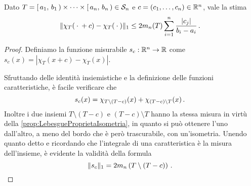\begin{lemma}\label{lemma:ContinuitaL1Semianello}
	Dato $T=\left[\,a_1,\,b_1\,\right)\times\cdots\times\left[\,a_n,\,b_n\,\right)\in\mathcal S_n$ e $c=(c_1,\dots,c_n)\in\mathbb R^n$, vale la stima
	\begin{equation*}
		\Vert \chi_T({}\cdot{}+c)-\chi_T({}\cdot{})\Vert_1\le 2m_n(T)\sum_{i=1}^n \frac{\lvert c_j\rvert }{b_i-a_i} \, \text{. }
	\end{equation*}
\end{lemma}
\begin{proof}
	Definiamo la funzione misurabile $s_c:\mathbb R^n\to\mathbb R$ come $s_c(x)=\left\lvert\chi_T(x+c)-\chi_T(x)\right\rvert$.
	
	Sfruttando delle identità insiemistiche e la definizione delle funzioni caratteristiche, è facile verificare che
	\begin{equation*}
		s_c(x)=\chi_{T\setminus\left(T-c\right)}(x)+\chi_{\left(T-c\right)\setminus T}(x)\, \text{. }
	\end{equation*}
	Inoltre i due insiemi $T\setminus\left(T-c\right)$ e $\left(T-c\right)\setminus T$ hanno la stessa misura in virtù della \cref{prop:LebesgueProprietaIsometria}, in quanto si può ottenere l'uno dall'altro, a meno del bordo che è però trascurabile, con un'isometria.
	Unendo quanto detto e ricordando che l'integrale di una caratteristica è la misura dell'insieme, è evidente la validità della formula
	\begin{equation} \label{eq:IdentitaIntegraleContinuitaL1}
		\Vert s_c\Vert_1=2m_n\left(T\setminus\left(T-c\right)\right)\, \text{. }
	\end{equation}
	

\end{proof}
